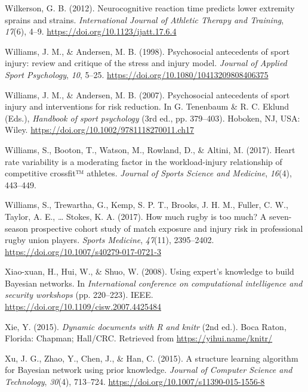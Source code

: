 \documentclass[man,floatsintext]{apa6}
\begin{document}
\leavevmode\hypertarget{ref-Wilkerson2012a}{}%
Wilkerson, G. B. (2012). Neurocognitive reaction time predicts lower extremity sprains and strains. \emph{International Journal of Athletic Therapy and Training}, \emph{17}(6), 4--9. \url{https://doi.org/10.1123/ijatt.17.6.4}

\leavevmode\hypertarget{ref-Williams1998}{}%
Williams, J. M., \& Andersen, M. B. (1998). Psychosocial antecedents of sport injury: review and critique of the stress and injury model. \emph{Journal of Applied Sport Psychology}, \emph{10}, 5--25. \url{https://doi.org/10.1080/10413209808406375}

\leavevmode\hypertarget{ref-Williams2007}{}%
Williams, J. M., \& Andersen, M. B. (2007). Psychosocial antecedents of sport injury and interventions for risk reduction. In G. Tenenbaum \& R. C. Eklund (Eds.), \emph{Handbook of sport psychology} (3rd ed., pp. 379--403). Hoboken, NJ, USA: Wiley. \url{https://doi.org/10.1002/9781118270011.ch17}

\leavevmode\hypertarget{ref-Williams2017}{}%
Williams, S., Booton, T., Watson, M., Rowland, D., \& Altini, M. (2017). Heart rate variability is a moderating factor in the workload-injury relationship of competitive crossfit™ athletes. \emph{Journal of Sports Science and Medicine}, \emph{16}(4), 443--449.

\leavevmode\hypertarget{ref-Williams2017b}{}%
Williams, S., Trewartha, G., Kemp, S. P. T., Brooks, J. H. M., Fuller, C. W., Taylor, A. E., \ldots{} Stokes, K. A. (2017). How much rugby is too much? A seven-season prospective cohort study of match exposure and injury risk in professional rugby union players. \emph{Sports Medicine}, \emph{47}(11), 2395--2402. \url{https://doi.org/10.1007/s40279-017-0721-3}

\leavevmode\hypertarget{ref-Xiao-xuan2007}{}%
Xiao-xuan, H., Hui, W., \& Shuo, W. (2008). Using expert's knowledge to build Bayesian networks. In \emph{International conference on computational intelligence and security workshops} (pp. 220--223). IEEE. \url{https://doi.org/10.1109/cisw.2007.4425484}

\leavevmode\hypertarget{ref-R-knitr}{}%
Xie, Y. (2015). \emph{Dynamic documents with R and knitr} (2nd ed.). Boca Raton, Florida: Chapman; Hall/CRC. Retrieved from \url{https://yihui.name/knitr/}

\leavevmode\hypertarget{ref-Xu2015}{}%
Xu, J. G., Zhao, Y., Chen, J., \& Han, C. (2015). A structure learning algorithm for Bayesian network using prior knowledge. \emph{Journal of Computer Science and Technology}, \emph{30}(4), 713--724. \url{https://doi.org/10.1007/s11390-015-1556-8}
\end{document}
